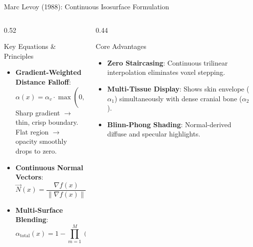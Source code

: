 \documentclass[aspectratio=169,11pt]{beamer}
\begin{document}
\begin{frame}{Marc Levoy (1988): Continuous Isosurface Formulation}
  \begin{columns}[T]
    \begin{column}{0.52\textwidth}
      \begin{block}{Key Equations \& Principles}
        \begin{itemize}
          \item \textbf{Gradient-Weighted Distance Falloff}:
            $$\alpha(x) = \alpha_v \cdot \max\left(0, \, 1 - \frac{1}{r} \left| \frac{f(x) - f_v}{\|\nabla f(x)\|} \right|\right)$$
            Sharp gradient $\rightarrow$ thin, crisp boundary.\\
            Flat region $\rightarrow$ opacity smoothly drops to zero.
          \item \textbf{Continuous Normal Vectors}:
            $$\vec{N}(x) = \frac{\nabla f(x)}{\|\nabla f(x)\|}, \quad \text{via central differences}$$
          \item \textbf{Multi-Surface Blending}:
            $$\alpha_{\text{total}}(x) = 1 - \prod_{m=1}^{M} (1 - \alpha_m(x))$$
        \end{itemize}
      \end{block}
    \end{column}

    \begin{column}{0.44\textwidth}
      \begin{block}{Core Advantages}
        \begin{itemize}
          \item \textbf{Zero Staircasing}: Continuous trilinear interpolation eliminates voxel stepping.
          \item \textbf{Multi-Tissue Display}: Shows skin envelope ($\alpha_1$) simultaneously with dense cranial bone ($\alpha_2$).
          \item \textbf{Blinn-Phong Shading}: Normal-derived diffuse and specular highlights.
        \end{itemize}
      \end{block}
    \end{column}
  \end{columns}
\end{frame}
\end{document}
